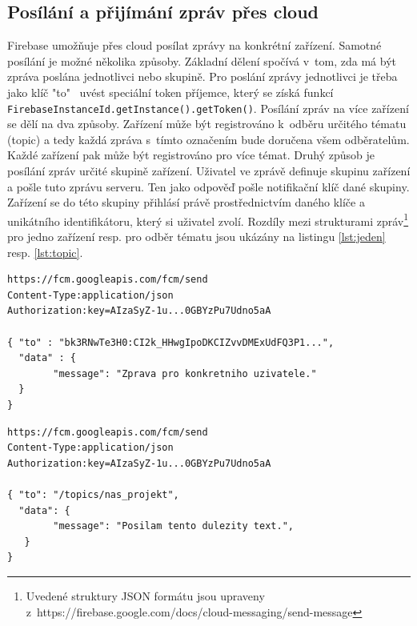 \subsection*{Posílání a přijímání zpráv přes cloud}

Firebase umožňuje přes cloud posílat zprávy na konkrétní zařízení. Samotné posílání je možné několika způsoby. Základní dělení spočívá v~tom, zda má být zpráva poslána jednotlivci nebo skupině. Pro poslání zprávy jednotlivci je třeba jako klíč "to"~ uvést speciální token příjemce, který se získá funkcí \texttt{FirebaseInstanceId.getInstance().getToken()}. Posílání zpráv na více zařízení se dělí na dva způsoby. Zařízení může být registrováno k~odběru určitého tématu (topic) a tedy každá zpráva s~tímto označením bude doručena všem odběratelům. Každé zařízení pak může být registrováno pro více témat. Druhý způsob je posílání zpráv určité skupině zařízení. Uživatel ve zprávě definuje skupinu zařízení a pošle tuto zprávu serveru. Ten jako odpověď pošle notifikační klíč dané skupiny. Zařízení se do této skupiny přihlásí právě prostřednictvím daného klíče a unikátního identifikátoru, který si uživatel zvolí. Rozdíly mezi strukturami zpráv\footnote{Uvedené struktury JSON formátu jsou upraveny z~https://firebase.google.com/docs/cloud-messaging/send-message} pro jedno zařízení resp. pro odběr tématu jsou ukázány na listingu \ref{lst:jeden} resp. \ref{lst:topic}.


\begin{lstlisting}[frame=single, caption={Příklad struktury zprávy pro poslání konkrétnímu uživateli. Na prvním řádku je adresa serveru, druhý udává formát zprávy a na třetím je autorizační klíč, který je unikátní pro každou aplikaci ve Firebase a odlišuje tak zprávy jiných aplikací. Klíč "to"~ obsahuje token příjemce.}, captionpos=b, label={lst:jeden}]
https://fcm.googleapis.com/fcm/send
Content-Type:application/json
Authorization:key=AIzaSyZ-1u...0GBYzPu7Udno5aA

{ "to" : "bk3RNwTe3H0:CI2k_HHwgIpoDKCIZvvDMExUdFQ3P1...",
  "data" : {
    	"message": "Zprava pro konkretniho uzivatele."
  }  
}

\end{lstlisting}

\begin{lstlisting}[frame=single, caption={Příklad struktury zprávy pro poslání na konkrétní téma.}, captionpos=b,label={lst:topic}]
https://fcm.googleapis.com/fcm/send
Content-Type:application/json
Authorization:key=AIzaSyZ-1u...0GBYzPu7Udno5aA

{ "to": "/topics/nas_projekt",
  "data": {
    	"message": "Posilam tento dulezity text.",
   }
}
\end{lstlisting}

